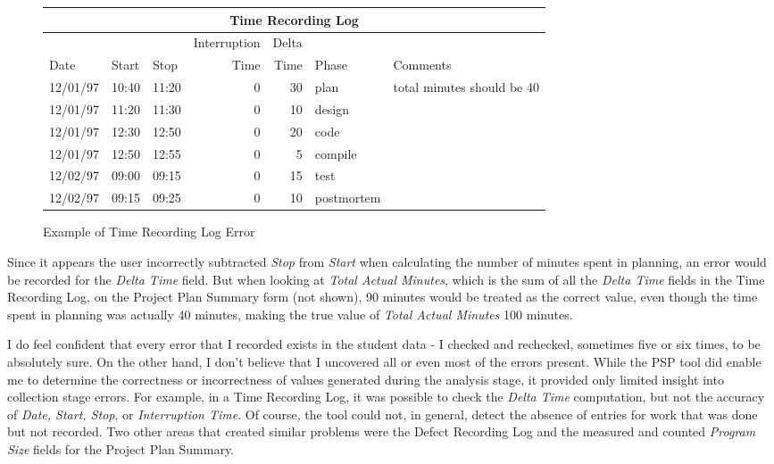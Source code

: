 \begin{figure} [h]
\begin{center} 
\begin{tabular} {|l|l|l|r|r|l|l|}\hline 
\multicolumn{7}{|c|}{\bf Time Recording Log}\\ \hline 
     &       &      & Interruption & Delta &       &          \\
Date & Start & Stop & Time         & Time  & Phase & Comments \\ \hline\hline 
12/01/97 & 10:40 & 11:20 & 0 & 30 & plan       & total minutes should be 40 \\ \hline 
12/01/97 & 11:20 & 11:30 & 0 & 10 & design     & \\ \hline 
12/01/97 & 12:30 & 12:50 & 0 & 20 & code       & \\ \hline 
12/01/97 & 12:50 & 12:55 & 0 &  5 & compile    & \\ \hline 
12/02/97 & 09:00 & 09:15 & 0 & 15 & test       & \\ \hline 
12/02/97 & 09:15 & 09:25 & 0 & 10 & postmortem & \\ \hline
\end{tabular} 
\caption{Example of Time Recording Log Error}\label{fig:timelog} 
\end{center} 
\end{figure}
 
Since it appears the user incorrectly subtracted {\it Stop} from {\it
  Start} when calculating the number of minutes spent in planning, an error
would be recorded for the {\it Delta Time} field.  But when looking at {\it
  Total Actual Minutes}, which is the sum of all the {\it Delta Time}
fields in the Time Recording Log, on the Project Plan Summary form (not
shown), 90 minutes would be treated as the correct value, even though the
time spent in planning was actually 40 minutes, making the true value of
{\it Total Actual Minutes} 100 minutes.

I do feel confident that every error that I recorded exists in the student
data - I checked and rechecked, sometimes five or six times, to be
absolutely sure.  On the other hand, I don't believe that I uncovered all
or even most of the errors present.  While the PSP tool did enable me to
determine the correctness or incorrectness of values generated during the
analysis stage, it provided only limited insight into collection stage
errors.  For example, in a Time Recording Log, it was possible to check
the {\it Delta Time} computation, but not the accuracy of {\it Date, Start, 
Stop}, or {\it Interruption Time}.  Of course, the tool could not, in
general, detect the absence of entries for work that was done but not
recorded.  Two other areas that created similar problems were the Defect
Recording Log and the measured and counted {\it Program Size} fields for
the Project Plan Summary.

